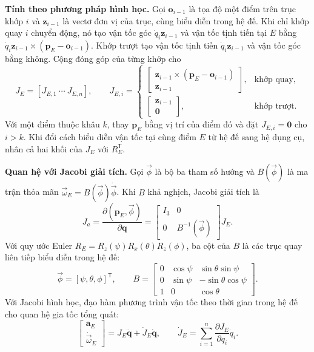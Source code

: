 \noindent\textbf{Tính theo phương pháp hình học.}
Gọi \(\mathbf o_{i-1}\) là tọa độ một điểm trên trục khớp \(i\) và \(\mathbf z_{i-1}\) là vectơ đơn vị của trục, cùng biểu diễn trong hệ đế. Khi chỉ khớp quay \(i\) chuyển động, nó tạo vận tốc góc \(\dot q_i\mathbf z_{i-1}\) và vận tốc tịnh tiến tại \(E\) bằng \(\dot q_i\mathbf z_{i-1}\times(\mathbf p_E-\mathbf o_{i-1})\). Khớp trượt tạo vận tốc tịnh tiến \(\dot q_i\mathbf z_{i-1}\) và vận tốc góc bằng không. Cộng đóng góp của từng khớp cho
\begin{equation}
 J_E=[J_{E,1}\ \cdots\ J_{E,n}],\qquad
 J_{E,i}=
 \begin{cases}
  \begin{bmatrix}
   \mathbf z_{i-1}\times(\mathbf p_E-\mathbf o_{i-1})\\
   \mathbf z_{i-1}
  \end{bmatrix}, & \text{khớp quay},\\[8pt]
  \begin{bmatrix}\mathbf z_{i-1}\\\mathbf 0\end{bmatrix}, & \text{khớp trượt}.
 \end{cases}
 \label{eq:sr5-jacobian-column}
\end{equation}
Với một điểm thuộc khâu \(k\), thay \(\mathbf p_E\) bằng vị trí của điểm đó và đặt \(J_{E,i}=\mathbf 0\) cho \(i>k\). Khi đổi cách biểu diễn vận tốc tại cùng điểm \(E\) từ hệ đế sang hệ dụng cụ, nhân cả hai khối của \(J_E\) với \(R_E^{\mathsf T}\).

\noindent\textbf{Quan hệ với Jacobi giải tích.}
Gọi \(\vec{\phi}\) là bộ ba tham số hướng và \(B(\vec{\phi})\) là ma trận thỏa mãn \(\vec{\omega}_E=B(\vec{\phi})\dot{\vec{\phi}}\). Khi \(B\) khả nghịch, Jacobi giải tích là
\[
 J_a=\frac{\partial(\mathbf p_E,\vec{\phi})}{\partial\mathbf q}
     =\begin{bmatrix} I_3&0\\0&B^{-1}(\vec{\phi})\end{bmatrix}J_E.
\]
Với quy ước Euler \(R_E=R_z(\psi)R_x(\theta)R_z(\phi)\), ba cột của \(B\) là các trục quay liên tiếp biểu diễn trong hệ đế:
\[
 \vec{\phi}=[\psi,\theta,\phi]^{\mathsf T},\qquad
 B=\begin{bmatrix}
 0&\cos\psi&\sin\theta\sin\psi\\
 0&\sin\psi&-\sin\theta\cos\psi\\
 1&0&\cos\theta
 \end{bmatrix}.
\]
Với Jacobi hình học, đạo hàm phương trình vận tốc theo thời gian trong hệ đế cho quan hệ gia tốc tổng quát:
\[
 \begin{bmatrix}\mathbf a_E\\\dot{\vec{\omega}}_E\end{bmatrix}
 =J_E\ddot{\mathbf q}+\dot J_E\dot{\mathbf q},
 \qquad
 \dot J_E=\sum_{i=1}^{n}\frac{\partial J_E}{\partial q_i}\dot q_i .
\]

